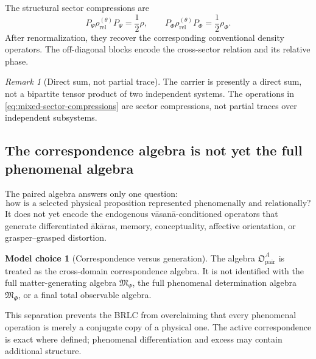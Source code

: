 \documentclass[11pt,reqno]{scrartcl}
\newcommand{\algP}{\mathfrak M_{\Psi}}
\newcommand{\algF}{\mathfrak M_{\Phi}}
\newcommand{\PP}{P_{\Psi}}
\newcommand{\PF}{P_{\Phi}}
\newcommand{\obsPair}{\mathfrak O_{\mathrm{pair}}^{A}}
\theoremstyle{plain}
\theoremstyle{definition}
\newtheorem{modelchoice}[modelchoice]{Model choice}
\theoremstyle{remark}
\newtheorem{remark}[remark]{Remark}
\begin{document}
The structural sector compressions are
\begin{equation}
  \PP\rho_{\mathrm{rel}}^{(\theta)}\PP
  =\frac12\rho,
  \qquad
  \PF\rho_{\mathrm{rel}}^{(\theta)}\PF
  =\frac12\rho_{\Phi}.
  \label{eq:mixed-sector-compressions}
\end{equation}
After renormalization, they recover the corresponding conventional density
operators.  The off-diagonal blocks encode the cross-sector relation and its
relative phase.

\begin{remark}[Direct sum, not partial trace]
\label{rem:direct-sum-not-partial-trace}
The carrier is presently a direct sum, not a bipartite tensor product of two
independent systems.  The operations in \eqref{eq:mixed-sector-compressions}
are sector compressions, not partial traces over independent subsystems.
\end{remark}

\subsection{The correspondence algebra is not yet the full phenomenal algebra}

The paired algebra answers only one question:
\begin{equation}
  \text{how is a selected physical proposition represented phenomenally and
  relationally?}
  \label{eq:paired-algebra-question}
\end{equation}
It does not yet encode the endogenous v\=asan\=a-conditioned operators that
generate differentiated \=ak\=aras, memory, conceptuality, affective
orientation, or grasper--grasped distortion.

\begin{modelchoice}[Correspondence versus generation]
\label{choice:correspondence-versus-generation}
The algebra \(\obsPair\) is treated as the cross-domain correspondence
algebra.  It is not identified with the full matter-generating algebra
\(\algP\), the full phenomenal determination algebra \(\algF\), or a final
total observable algebra.
\end{modelchoice}

This separation prevents the BRLC from overclaiming that every phenomenal
operation is merely a conjugate copy of a physical one.  The active
correspondence is exact where defined; phenomenal differentiation and excess
may contain additional structure.
\end{document}
